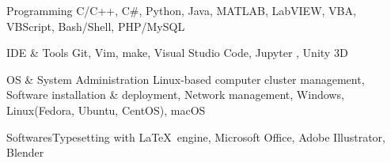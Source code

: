 \begin{cvskills}


\cvskill
{Programming}
{C/C++, C\#, Python, Java, MATLAB, LabVIEW, VBA, VBScript, Bash/Shell, PHP/MySQL}


\cvskill
{IDE \& Tools}
{Git, Vim, make, Visual Studio Code, Jupyter , Unity 3D}


\cvskill
{OS \& System Administration}
{Linux-based computer cluster management, Software installation \& deployment, Network management, Windows, Linux(Fedora, Ubuntu, CentOS), macOS}


\cvskill
{Softwares}{Typesetting with \LaTeX\ engine, Microsoft Office, Adobe Illustrator, Blender}


\end{cvskills}